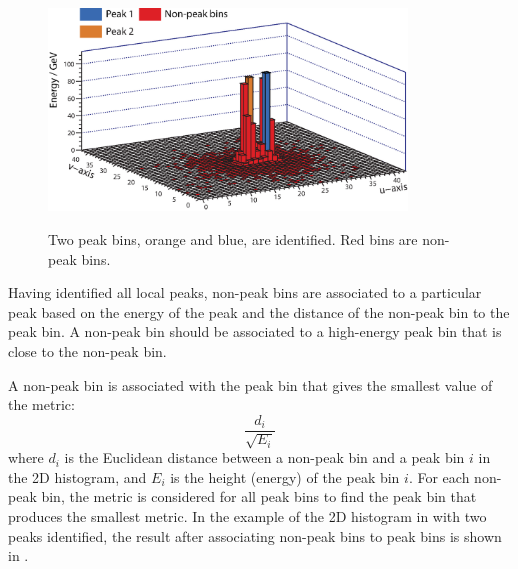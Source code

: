 


\begin{figure}[tbph]
\centering
{\includegraphics[width=0.85\textwidth]{photon/peakFindingPeakOnly}}
\caption[Example of projecting a large photon cluster containing two photons.]
{Two peak bins, orange and blue, are identified. Red bins are non-peak bins.}
\label{fig:photonPeakFindingPeakOnly}
\end{figure}



Having identified all local peaks,  non-peak bins  are associated to a particular peak based on the energy of the peak and the distance of the non-peak bin to the peak bin. A non-peak bin should be associated to a high-energy peak bin that is close to the non-peak bin.

A non-peak bin is associated with the peak bin that gives the smallest value of the metric:
\begin{equation}
\frac{d_{i}}{\sqrt{E_{i}}}
\end{equation}
where $d_{i}$ is the Euclidean distance between a non-peak bin and a  peak bin $i$ in the 2D histogram, and $E_{i}$ is the height (energy) of the peak bin $i$. For each non-peak bin, the metric is considered for all peak bins to find the peak bin that produces the smallest metric. In the example of the 2D histogram in  with two peaks identified, the result after associating non-peak bins to peak bins is shown in .


